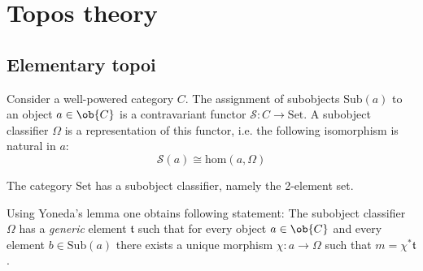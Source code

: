\chapter{Topos theory}

\section{Elementary topoi}

	\begin{adefinition}
		Consider a well-powered category $C$. The assignment of subobjects Sub$(a)$ to an object $a\in\ob{C}$ is a contravariant functor $\mathcal{S}:C\rightarrow\text{Set}$. A subobject classifier $\Omega$ is a representation of this functor, i.e. the following isomorphism is natural in $a$:
		\begin{equation}
			\mathcal{S}(a)\cong\text{hom}(a, \Omega)
		\end{equation}
	\end{adefinition}
	
	\begin{example}
		The category Set has a subobject classifier, namely the 2-element set.
	\end{example}
	
	\begin{property}
		Using Yoneda's lemma one obtains following statement: The subobject classifier $\Omega$ has a \textit{generic} element $\mathfrak{t}$ such that for every object $a\in\ob{C}$ and every element $b\in\text{Sub}(a)$ there exists a unique morphism $\chi:a\rightarrow\Omega$ such that $m = \chi^*\mathfrak{t}$.
	\end{property}

